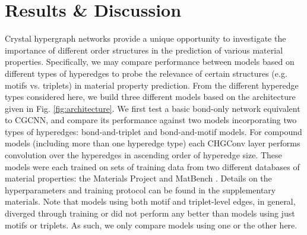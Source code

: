 \documentclass[10pt,a4paper,twocolumn]{article}
\begin{document}
\section{Results \& Discussion}
Crystal hypergraph networks provide a unique opportunity to investigate the importance of different order structures in the prediction of various material properties. Specifically, we may compare performance between models based on different types of hyperedges to probe the relevance of certain structures (e.g. motifs vs. triplets) in material property prediction. From the different hyperedge types considered here, we build three different models based on the architecture given in Fig. \ref{fig:architecture}.
We first test a basic bond-only network equivalent to CGCNN, and compare its performance against two models incorporating two types of hyperedges: bond-and-triplet and bond-and-motif models. 
For compound models (including more than one hyperedge type) each CHGConv layer performs convolution over the hyperedges in ascending order of hyperedge size. These models were each trained on sets of training data from two different databases of material properties: the Materials Project \cite{matproj} and MatBench \cite{matbench}. Details on the hyperparameters and training protocol can be found in the supplementary materials. Note that models using both motif and triplet-level edges, in general, diverged through training or did not perform any better than models using just motifs or triplets. As such, we only compare models using one or the other here.
\end{document}
